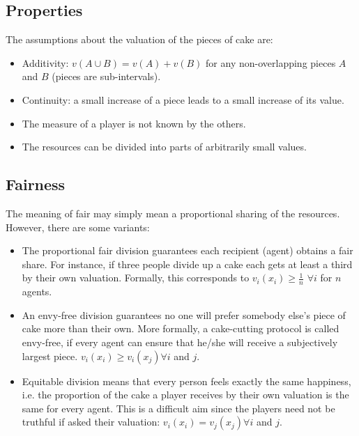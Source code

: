 \subsection{Properties}

The assumptions about the valuation of the pieces of cake are:
\begin{itemize}
\item Additivity: $v(A \cup B) = v(A) + v(B)$ for any non-overlapping pieces $A$ and $B$
(pieces are sub-intervals). 
\item 
Continuity: a small increase of a piece leads to a small increase of its value. 
\item The measure of a player is not known by the others.
\item The resources can be divided into parts of arbitrarily small values.
\end{itemize}

\subsection{Fairness}

The meaning of fair may simply mean a proportional sharing of the resources. 
However, there are some variants:

\begin{itemize}
\item The proportional fair division guarantees each recipient (agent) obtains a fair share. 
For instance, if three people divide up a cake each gets at least a third by their own valuation. 
Formally, this corresponds to $v_i(x_i) \geq \frac{1}{n}$ $\forall i$ for $n$ agents.
\item An envy-free division guarantees no one will prefer somebody else's piece of cake more than their own. More formally, 
a cake-cutting protocol is called envy-free, if every agent can ensure that he/she will receive a subjectively largest piece.
 $v_i(x_i) \geq v_i(x_j) \forall i$ and $j$.
\item Equitable division means that every person feels exactly the same happiness, 
i.e. the proportion of the cake a player receives by their own valuation is the same for every agent. 
This is a difficult aim since the players need not be truthful if asked their valuation:
 $v_i(x_i) = v_j(x_j) \forall i$ and $j$.
 \end{itemize}

